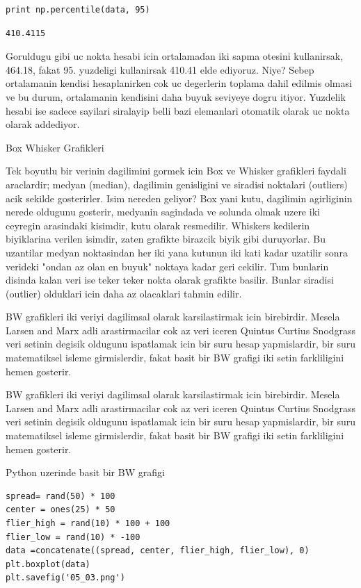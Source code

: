 \documentclass[12pt,fleqn]{article}\usepackage{../common}
\begin{document}
\begin{verbatim}
print np.percentile(data, 95)
\end{verbatim}

\begin{verbatim}
410.4115
\end{verbatim}

Goruldugu gibi uc nokta hesabi icin ortalamadan iki sapma otesini
kullanirsak, 464.18, fakat 95. yuzdeligi kullanirsak 410.41 elde
ediyoruz. Niye? Sebep ortalamanin kendisi hesaplanirken cok uc
degerlerin toplama dahil edilmis olmasi ve bu durum, ortalamanin
kendisini daha buyuk seviyeye dogru itiyor. Yuzdelik hesabi ise sadece
sayilari siralayip belli bazi elemanlari otomatik olarak uc nokta
olarak addediyor.

Box Whisker Grafikleri

Tek boyutlu bir verinin dagilimini gormek icin Box ve Whisker grafikleri
faydali araclardir; medyan (median), dagilimin genisligini ve siradisi
noktalari (outliers) acik sekilde gosterirler. Isim nereden geliyor? Box
yani kutu, dagilimin agirliginin nerede oldugunu gosterir, medyanin
sagindada ve solunda olmak uzere iki ceyregin arasindaki kisimdir, kutu
olarak resmedilir. Whiskers kedilerin biyiklarina verilen isimdir, zaten
grafikte birazcik biyik gibi duruyorlar. Bu uzantilar medyan noktasindan
her iki yana kutunun iki kati kadar uzatilir sonra verideki "ondan az olan
en buyuk" noktaya kadar geri cekilir. Tum bunlarin disinda kalan veri ise
teker teker nokta olarak grafikte basilir. Bunlar siradisi (outlier)
olduklari icin daha az olacaklari tahmin edilir.

BW grafikleri iki veriyi dagilimsal olarak karsilastirmak icin
birebirdir. Mesela Larsen and Marx adli arastirmacilar cok az veri
iceren Quintus Curtius Snodgrass veri setinin degisik oldugunu
ispatlamak icin bir suru hesap yapmislardir, bir suru matematiksel
isleme girmislerdir, fakat basit bir BW grafigi iki setin farkliligini
hemen gosterir.

BW grafikleri iki veriyi dagilimsal olarak karsilastirmak icin
birebirdir. Mesela Larsen and Marx adli arastirmacilar cok az veri
iceren Quintus Curtius Snodgrass veri setinin degisik oldugunu
ispatlamak icin bir suru hesap yapmislardir, bir suru matematiksel
isleme girmislerdir, fakat basit bir BW grafigi iki setin farkliligini
hemen gosterir.

Python uzerinde basit bir BW grafigi 

\begin{verbatim}
spread= rand(50) * 100
center = ones(25) * 50
flier_high = rand(10) * 100 + 100
flier_low = rand(10) * -100
data =concatenate((spread, center, flier_high, flier_low), 0)
plt.boxplot(data)
plt.savefig('05_03.png')
\end{verbatim}
\end{document}
